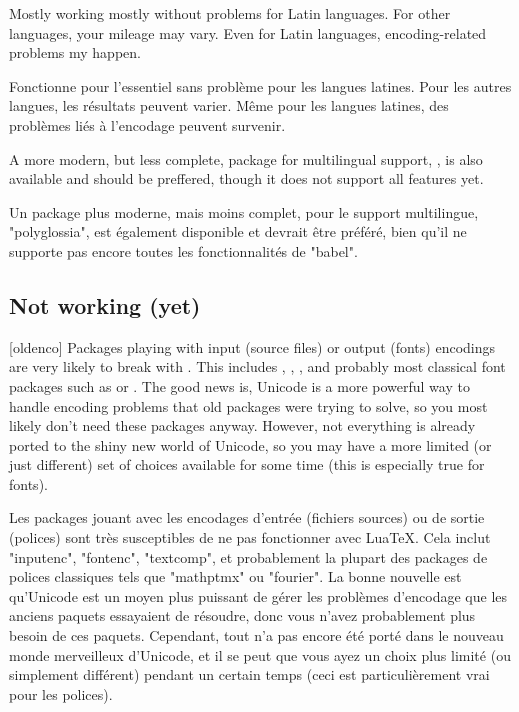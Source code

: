 \documentclass{lltxdoc}
\begin{document}
Mostly working mostly without problems for Latin languages. For other
languages, your mileage may vary. Even for Latin languages, encoding-related
problems my happen.


Fonctionne pour l'essentiel sans problème pour les langues latines. Pour les autres langues, les résultats peuvent varier. Même pour les langues latines, des problèmes liés à l'encodage peuvent survenir.

A more modern, but less complete, package for multilingual support,
, is also available and should be preffered, though it does
not support all  features yet.

Un package plus moderne, mais moins complet, pour le support multilingue, "polyglossia", est également disponible et devrait être préféré, bien qu'il ne supporte pas encore toutes les fonctionnalités de "babel".

\subsection{Not working (yet)}\label{notworking}

[oldenco] Packages playing with input (source files) or
output (fonts) encodings are very likely to break with \luatex. This includes
, , , and probably most classical font
packages such as  or . The good news
is, Unicode is a more powerful way to handle encoding problems that old
packages were trying to solve, so you most likely don't need these packages
anyway. However, not everything is already ported to the shiny new world of
Unicode, so you may have a more limited (or just different) set of choices
available for some time (this is especially true for fonts).

Les packages jouant avec les encodages d'entrée (fichiers sources) ou de sortie (polices) sont très susceptibles de ne pas fonctionner avec LuaTeX. Cela inclut "inputenc", "fontenc", "textcomp", et probablement la plupart des packages de polices classiques tels que "mathptmx" ou "fourier". La bonne nouvelle est qu'Unicode est un moyen plus puissant de gérer les problèmes d'encodage que les anciens paquets essayaient de résoudre, donc vous n'avez probablement plus besoin de ces paquets. Cependant, tout n'a pas encore été porté dans le nouveau monde merveilleux d'Unicode, et il se peut que vous ayez un choix plus limité (ou simplement différent) pendant un certain temps (ceci est particulièrement vrai pour les polices).
\end{document}

